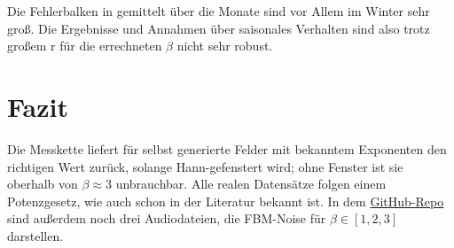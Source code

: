 \documentclass[]{scrartcl}
\numberwithin{equation}{section}
\begin{document}
Die Fehlerbalken in  gemittelt über die Monate sind vor Allem im Winter sehr groß. Die Ergebnisse und Annahmen über saisonales Verhalten sind also trotz großem r für die errechneten $\beta$ nicht sehr robust.


\section{Fazit}

Die Messkette liefert für selbst generierte Felder mit bekanntem Exponenten den
richtigen Wert zurück, solange Hann-gefenstert wird; ohne Fenster ist sie oberhalb
von $\beta \approx 3$ unbrauchbar. Alle realen Datensätze folgen einem Potenzgesetz, wie
auch schon in der Literatur bekannt ist. 
In dem \href{https://github.com/vincmarks/mod_fractals}{GitHub-Repo} sind außerdem noch drei Audiodateien, die 
FBM-Noise für $\beta \in [1,2,3]$ darstellen.
\end{document}
